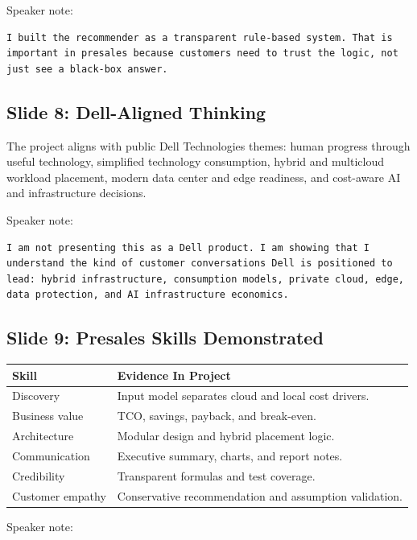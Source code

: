 \documentclass[11pt,a4paper]{article}
\begin{document}
Speaker note:

\begin{lstlisting}
I built the recommender as a transparent rule-based system. That is important in presales because customers need to trust the logic, not just see a black-box answer.
\end{lstlisting}

\subsection{Slide 8: Dell-Aligned Thinking}

The project aligns with public Dell Technologies themes: human progress through useful technology, simplified technology consumption, hybrid and multicloud workload placement, modern data center and edge readiness, and cost-aware AI and infrastructure decisions.

Speaker note:

\begin{lstlisting}
I am not presenting this as a Dell product. I am showing that I understand the kind of customer conversations Dell is positioned to lead: hybrid infrastructure, consumption models, private cloud, edge, data protection, and AI infrastructure economics.
\end{lstlisting}

\subsection{Slide 9: Presales Skills Demonstrated}

\begin{longtable}{p{}p{}}
\toprule
\textbf{Skill} & \textbf{Evidence In Project} \\
\midrule
Discovery & Input model separates cloud and local cost drivers. \\
Business value & TCO, savings, payback, and break-even. \\
Architecture & Modular design and hybrid placement logic. \\
Communication & Executive summary, charts, and report notes. \\
Credibility & Transparent formulas and test coverage. \\
Customer empathy & Conservative recommendation and assumption validation. \\
\bottomrule
\end{longtable}

Speaker note:
\end{document}
